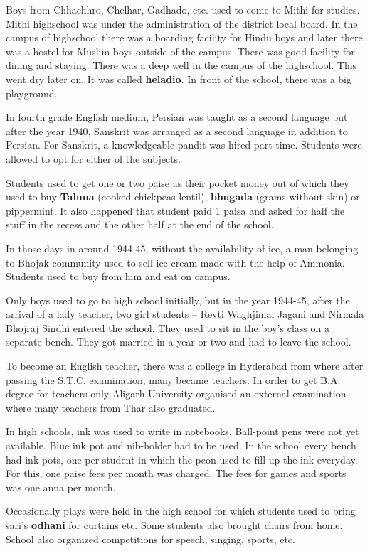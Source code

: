 Boys from Chhachhro, Chelhar, Gadhado, etc. used to come to Mithi for studies.
Mithi highschool was under the administration of the district local board. In
the campus of highschool there was a boarding facility for Hindu boys and later
there was a hostel for Muslim boys outside of the campus. There was good
facility for dining and staying. There was a deep well in the campus of the
highschool. This went dry later on. It was called \textbf{heladio}. In front of
the school, there was a big playground. 

In fourth grade English medium, Persian was taught as a second language but
after the year 1940, Sanskrit was arranged as a second language in addition to
Persian. For Sanskrit, a knowledgeable pandit was hired part-time. Students
were allowed to opt for either of the subjects. 

Students used to get one or two paise as their pocket money out of which they
used to buy \textbf{Taluna} (cooked chickpeas lentil), \textbf{bhugada} (grams
without skin) or pippermint. It also happened that student paid 1 paisa and
asked for half the stuff in the recess and  the other half at the end of the
school.  

In those days in around 1944-45, without the availability of ice, a man
belonging to Bhojak community used to sell ice-cream made with the help of
Ammonia. Students used to buy from him and eat on campus.

Only boys used to go to high school initially, but in the year 1944-45, after the
arrival of a lady teacher, two girl students -- Revti Waghjimal Jagani and
Nirmala Bhojraj Sindhi entered the school. They used to sit in the boy's class
on a separate bench. They got married in a year or two and had to leave the
school.

To become an English teacher, there was a college in Hyderabad from where after
passing the S.T.C. examination, many became teachers. In order to get B.A.
degree for teachers-only Aligarh University organised an external examination
where many teachers from Thar also graduated.

In high schools, ink was used to write in notebooks. Ball-point pens were not yet
available. Blue ink pot and nib-holder had to be used. In the school every bench
had ink pots, one per student in which the peon used to fill up the ink everyday.
For this, one paise fees per month was charged. The fees for games and sports
was one anna per month. 

Occasionally plays were held in the high school for which students used to bring
sari's \textbf{odhani} for curtains etc. Some students also brought chairs from
home. School also organized competitions for speech, singing, sports, etc.

